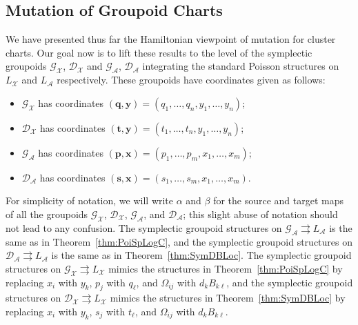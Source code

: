 \documentclass{amsart}
\numberwithin{equation}{section}
\newcommand{\bfp}{\mathbf{p}}
\newcommand{\bfq}{\mathbf{q}}
\newcommand{\bfs}{\mathbf{s}}
\newcommand{\bft}{\mathbf{t}}
\newcommand{\bfx}{\mathbf{x}}
\newcommand{\bfy}{\mathbf{y}}
\newcommand{\cA}{\mathcal{A}}
\newcommand{\cG}{\mathcal{G}}
\renewcommand{\cD}{\mathcal{D}}
\newcommand{\cX}{\mathcal{X}}
\newcommand{\rra}{\rightrightarrows}
\begin{document}
\subsection{Mutation of Groupoid Charts}
We have presented thus far the Hamiltonian viewpoint of mutation for cluster charts.
Our goal now is to lift these results to the level of the symplectic groupoids $\cG_\cX$, $\cD_\cX$ and $\cG_\cA$, $\cD_\cA$ integrating the standard Poisson structures on $L_\cX$ and $L_\cA$ respectively.
These groupoids have coordinates given as follows:
\begin{itemize}
  \item $\cG_\cX$ has coordinates $(\bfq,\bfy)=(q_1,\ldots,q_n,y_1,\ldots,y_n)$; 
  \item $\cD_\cX$ has coordinates $(\bft,\bfy)=(t_1,\ldots,t_n,y_1,\ldots,y_n)$; 
  \item $\cG_\cA$ has coordinates $(\bfp,\bfx)=(p_1,\ldots,p_m,x_1,\ldots,x_m)$; 
  \item $\cD_\cA$ has coordinates $(\bfs,\bfx)=(s_1,\ldots,s_m,x_1,\ldots,x_m)$.
\end{itemize}

For simplicity of notation, we will write $\alpha$ and $\beta$ for the source and target maps of all the groupoids $\cG_\cX$, $\cD_\cX$, $\cG_\cA$, and $\cD_\cA$; this slight abuse of notation should not lead to any confusion. The symplectic groupoid structures on $\cG_\cA \rra L_\cA$ is the same as in Theorem~\ref{thm:PoiSpLogC}, and the symplectic groupoid structures on $\cD_\cA \rra L_\cA$ is the same as in Theorem~\ref{thm:SymDBLoc}. The symplectic groupoid structures on $\cG_\cX \rra L_\cX$ mimics the structures in Theorem~\ref{thm:PoiSpLogC} by replacing $x_i$ with $y_k$, $p_j$ with $q_\ell$, and $\Omega_{ij}$ with $d_kB_{k\ell}$, and the symplectic groupoid structures on $\cD_\cX \rra L_\cX$ mimics the structures in Theorem~\ref{thm:SymDBLoc} by replacing $x_i$ with $y_k$, $s_j$ with $t_\ell$, and $\Omega_{ij}$ with $d_kB_{k\ell}$.
\end{document}
